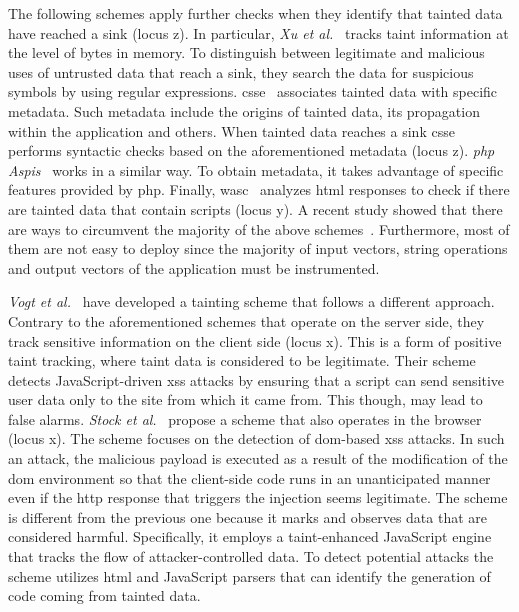 \documentclass[conference]{IEEEtran}
\begin{document}
The following schemes apply further checks when
they identify that tainted data have reached a sink
(locus {\sc z}).
In particular, {\it Xu et al.}~\cite{XBS06}
tracks taint information at the level of bytes in memory.
To distinguish between legitimate and malicious uses
of untrusted data that reach a sink,
they search the data for suspicious symbols by using
regular expressions. {\sc csse}~\cite{PB05} associates
tainted data with specific metadata. Such metadata include
the origins of tainted data, its propagation within the application
and others. When tainted data reaches a sink {\sc csse} performs
syntactic checks based on the aforementioned metadata
(locus {\sc z}). {\it {\sc php} Aspis}~\cite{PMP11} works
in a similar way. To obtain metadata, it takes advantage
of specific features provided by {\sc php}.
Finally, {\sc wasc}~\cite{NLC07} analyzes {\sc html} responses to check
if there are tainted data that contain scripts (locus {\sc y}).
A recent study showed that there are ways to circumvent
the majority of the above schemes~\cite{NBR14}.
Furthermore, most of them are not easy to deploy since
the majority of input vectors, string operations
and output vectors of the application must be instrumented.

{\it Vogt et al.}~\cite{VFJKKV07}
have developed a tainting scheme that follows a different
approach. Contrary to the aforementioned schemes that
operate on the server side, they track sensitive
information on the client side (locus {\sc x}).
This is a form of positive taint tracking, where
taint data is considered to be legitimate.
Their scheme detects JavaScript-driven {\sc xss}
attacks by ensuring that a script can send sensitive
user data only to the site from which it came from.
This though, may lead to false alarms.
{\it Stock et al.}~\cite{SLMS14} propose a scheme
that also operates in the browser (locus {\sc x}).
The scheme focuses on the detection of
{\sc dom}-based {\sc xss} attacks.
In such an attack, the malicious payload is
executed as a result of the modification of the
{\sc dom} environment so that the client-side
code runs in an unanticipated manner even if the
{\sc http} response that triggers the injection seems legitimate.
The scheme is different from the previous one because it
marks and observes data that are considered harmful.
Specifically, it employs a taint-enhanced JavaScript
engine that tracks the flow of attacker-controlled data.
To detect potential attacks the scheme utilizes
{\sc html} and JavaScript parsers that can
identify the generation of code coming from
tainted data.
\end{document}
